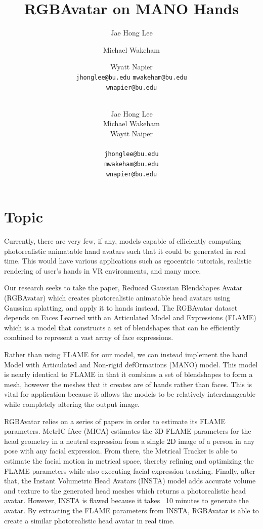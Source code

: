 \documentclass[11pt]{article}
\title{RGBAvatar on MANO Hands}
\author{Jae Hong Lee \and Michael Wakeham \and Wyatt Napier \\
\texttt{jhonglee@bu.edu}
\texttt{mwakeham@bu.edu} \\
\texttt{wnapier@bu.edu}}
\author{
  \\
  Jae Hong Lee  \\
  Michael Wakeham \\
  Waytt Naiper \\ \And
  \\
  \texttt{jhonglee@bu.edu} \\
  \texttt{mwakeham@bu.edu} \\
  \texttt{wnapier@bu.edu} \\
}
\begin{document}
\maketitle


\section{Topic}
Currently, there are very few, if any, models capable of efficiently computing photorealistic animatable hand avatars such that it could be generated in real time. This would have various applications such as egocentric tutorials, realistic rendering of user’s hands in VR environments, and many more.

Our research seeks to take the paper, Reduced Gaussian Blendshapes Avatar (RGBAvatar) which creates photorealistic animatable head avatars using Gaussian splatting, and apply it to hands instead. The RGBAvatar dataset depends on Faces Learned with an Articulated Model and Expressions (FLAME) which is a model that constructs a set of blendshapes that can be efficiently combined to represent a vast array of face expressions.

Rather than using FLAME for our model, we can instead implement the hand Model with Articulated and Non-rigid defOrmations (MANO) model. This model is nearly identical to FLAME in that it combines a set of blendshapes to form a mesh, however the meshes that it creates are of hands rather than faces. This is vital for application because it allows the models to be relatively interchangeable while completely altering the output image.


RGBAvatar relies on a series of papers in order to estimate its FLAME parameters. MetrIC fAce (MICA) estimates the 3D FLAME parameters for the head geometry in a neutral expression from a single 2D image of a person in any pose with any facial expression. From there, the Metrical Tracker is able to estimate the facial motion in metrical space, thereby refining and optimizing the FLAME parameters while also executing facial expression tracking. Finally, after that, the Instant Volumetric Head Avatars (INSTA) model adds accurate volume and texture to the generated head meshes which returns a photorealistic head avatar. However, INSTA is flawed because it takes ~10 minutes to generate the avatar. By extracting the FLAME parameters from INSTA, RGBAvatar is able to create a similar photorealistic head avatar in real time.
\end{document}
